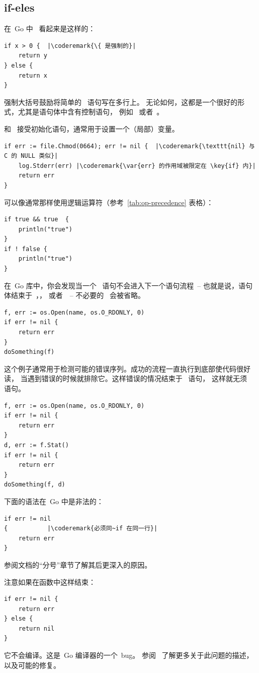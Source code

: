 \subsection{if-eles}
在~Go 中~ 看起来是这样的：
\begin{lstlisting}
if x > 0 {	|\coderemark{\{ 是强制的}|
    return y
} else {
    return x
}
\end{lstlisting}
强制大括号鼓励将简单的~ 语句写在多行上。
无论如何，这都是一个很好的形式，尤其是语句体中含有控制语句，
例如~ 或者~。

 和~ 接受初始化语句，通常用于设置一个（局部）变量。
\begin{lstlisting}
if err := file.Chmod(0664); err != nil {  |\coderemark{\texttt{nil} 与 C 的 NULL 类似}|
    log.Stderr(err) |\coderemark{\var{err} 的作用域被限定在 \key{if} 内}|
    return err
}
\end{lstlisting}
可以像通常那样使用逻辑运算符（参考~\ref{tab:op-precedence} 表格）：
\begin{lstlisting}
if true && true  {
    println("true")
}
if ! false {
    println("true")
}
\end{lstlisting}

在~Go 库中，你会发现当一个~ 语句不会进入下一个语句流程~-- 
也就是说，语句体结束于~，，
或者~~-- 不必要的~ 会被省略。

\begin{lstlisting}
f, err := os.Open(name, os.O_RDONLY, 0)
if err != nil {
    return err
}
doSomething(f)
\end{lstlisting}
这个例子通常用于检测可能的错误序列。成功的流程一直执行到底部使代码很好读，
当遇到错误的时候就排除它。这样错误的情况结束于~ 语句，
这样就无须~ 语句。
\begin{lstlisting}
f, err := os.Open(name, os.O_RDONLY, 0)
if err != nil {
    return err
}
d, err := f.Stat()
if err != nil {
    return err
}
doSomething(f, d)
\end{lstlisting}
下面的语法在~Go 中是非法的：
\begin{lstlisting}
if err != nil
{		    |\coderemark{必须同~if 在同一行}|
    return err
}
\end{lstlisting}
参阅文档\cite{effective_go}的``分号''章节了解其后更深入的原因。

\begin{lbar}
注意如果在函数中这样结束：
\begin{lstlisting}
if err != nil {
    return err
} else {
    return nil
}
\end{lstlisting}
它不会编译。这是~Go 编译器的一个~bug。
参阅~\cite{go_issue_65} 了解更多关于此问题的描述，以及可能的修复。
\end{lbar}

